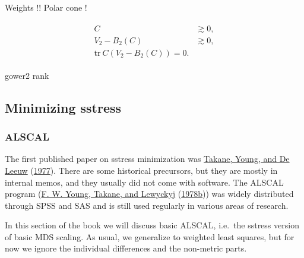 \documentclass[
  12pt,
]{book}
\theoremstyle{definition}
\theoremstyle{definition}
\theoremstyle{definition}
\theoremstyle{definition}
\theoremstyle{remark}
\begin{document}
Weights !! Polar cone !

\begin{align}
\begin{split}
C&\gtrsim 0,\\
V_2-B_2(C)&\gtrsim 0,\\
\text{tr}\ C(V_2-B_2(C))=0.
\end{split}
\end{align}

gower2 rank

\hypertarget{minimizing-sstress}{%
\subsection{Minimizing sstress}\label{minimizing-sstress}}

\hypertarget{alscal}{%
\subsubsection{ALSCAL}\label{alscal}}

The first published paper on sstress minimization was \protect\hyperlink{ref-takane_young_deleeuw_A_77}{Takane, Young, and De Leeuw} (\protect\hyperlink{ref-takane_young_deleeuw_A_77}{1977}).
There are some historical precursors, but they are mostly in internal memos, and
they usually did not come with software. The ALSCAL program (\protect\hyperlink{ref-young_takane_lewyckyj_78b}{F. W. Young, Takane, and Lewyckyj} (\protect\hyperlink{ref-young_takane_lewyckyj_78b}{1978b}))
was widely distributed through SPSS and SAS and is still used regularly in various areas of research.

In this section of the book we will discuss basic ALSCAL, i.e.~the sstress version of basic MDS scaling. As usual, we generalize to weighted least squares, but for now we ignore the individual differences and the non-metric parts.
\end{document}
